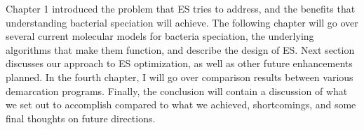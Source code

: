 Chapter 1 introduced the problem that ES tries to address, and the benefits that understanding bacterial speciation will achieve.
The following chapter will go over several current molecular models for bacteria speciation, the underlying algorithms that make them function, and describe the design of ES.
Next section discusses our approach to ES optimization, as well as other future enhancements planned.
In the fourth chapter, I will go over comparison results between various demarcation programs.
Finally, the conclusion will contain a discussion of what we set out to accomplish compared to what we achieved, shortcomings, and some final thoughts on future directions.

